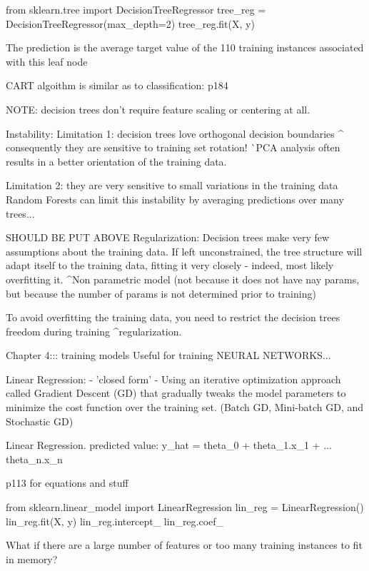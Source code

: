 from sklearn.tree import DecisionTreeRegressor
tree_reg = DecisionTreeRegressor(max_depth=2)
tree_reg.fit(X, y)

The prediction is the average target value of the
110 training instances associated with this leaf node




CART algoithm is similar as to classification: p184

NOTE:
decision trees don't require feature scaling or centering at all.

Instability:
Limitation 1: decision trees love orthogonal decision boundaries
^ consequently they are sensitive to training set rotation!
^^ PCA analysis often results in a better orientation of the training data.

Limitation 2: they are very sensitive to small variations in the training data
Random Forests can limit this instability by averaging predictions over many trees...


SHOULD BE PUT ABOVE Regularization:
Decision trees make very few assumptions about the training data.
If left unconstrained,
the tree structure will adapt itself to the training data,
fitting it very closely - indeed, most likely overfitting it.
^Non parametric model
(not because it does not have nay params,
but because the number of params is not determined prior to training)

To avoid overfitting the training data,
you need to restrict the decision trees freedom during training
^regularization.







Chapter 4::: training models
Useful for training NEURAL NETWORKS...

Linear Regression:
- 'closed form'
-
Using an iterative optimization approach called Gradient Descent (GD)
that gradually tweaks the model parameters to minimize the cost function over the training set.
(Batch GD, Mini-batch GD, and Stochastic GD)

Linear Regression.
predicted value: y_hat = theta_0 + theta_1.x_1 + ... theta_n.x_n

p113 for equations and stuff

from sklearn.linear_model import LinearRegression
lin_reg = LinearRegression()
lin_reg.fit(X, y)
lin_reg.intercept_
lin_reg.coef_

What if there are a large number of features
or too many training instances to fit in memory?

